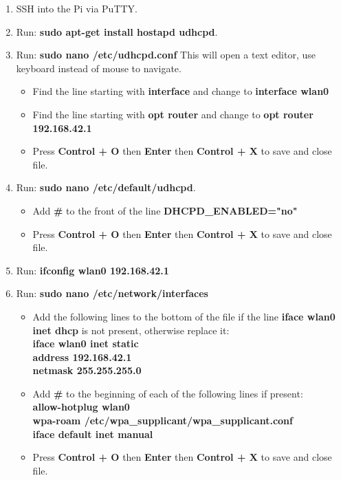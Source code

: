 \documentclass[titlepage,12pt,letter]{report}
\numberwithin{equation}{chapter}
\begin{document}
\begin{enumerate}[noitemsep,topsep=0pt]
	\item SSH into the Pi via PuTTY.
	\item Run: \textbf{sudo apt-get install hostapd udhcpd}.
	\item Run: \textbf{sudo nano /etc/udhcpd.conf} This will open a text editor, use keyboard instead of mouse to navigate.
		\begin{itemize}[noitemsep,topsep=0pt]
			\item Find the line starting with \textbf{interface} and change to \textbf{interface wlan0}
			\item Find the line starting with \textbf{opt router} and change to \textbf{opt router 192.168.42.1}
			\item Press \textbf{Control + O} then \textbf{Enter} then \textbf{Control + X} to save and close file.
		\end{itemize}
	
	\item Run: \textbf{sudo nano /etc/default/udhcpd}.
	\begin{itemize}[noitemsep,topsep=0pt]
		\item Add \textbf{\#} to the front of the line \textbf{DHCPD\_ENABLED="no"}
		\item Press \textbf{Control + O} then \textbf{Enter} then \textbf{Control + X} to save and close file.
	\end{itemize}

	\item Run: \textbf{ifconfig wlan0 192.168.42.1}
	\item Run: \textbf{sudo nano /etc/network/interfaces}
	\begin{itemize}[noitemsep,topsep=0pt]
		\item Add the following lines to the bottom of the file if the line \textbf{iface wlan0 inet dhcp} is not present, otherwise replace it: \\
		\textbf{iface wlan0 inet static} \\
		\textbf{address 192.168.42.1} \\
		\textbf{netmask 255.255.255.0}
		\item Add \textbf{\#} to the beginning of each of the following lines if present: \\
		\textbf{allow-hotplug wlan0}\\
		\textbf{wpa-roam /etc/wpa\_supplicant/wpa\_supplicant.conf}\\
		\textbf{iface default inet manual}
		\item Press \textbf{Control + O} then \textbf{Enter} then \textbf{Control + X} to save and close file.
	\end{itemize}


\end{enumerate}
\end{document}
